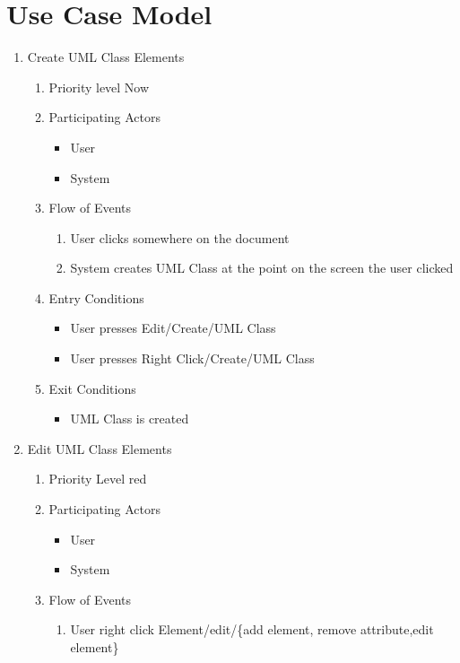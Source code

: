 \documentclass[a4paper, 12pt]{article}
\begin{document}
\section{Use Case Model}

\begin{enumerate}
	\item Create UML Class Elements
	\begin {enumerate}
		\item Priority level Now
		\item Participating Actors
		\begin{itemize}
			\item User
			\item System
		\end {itemize}
		\item Flow of Events
		\begin {enumerate}
			\item User clicks somewhere on the document
			\item System creates UML Class at the point on the screen the user clicked
		\end {enumerate}
		\item Entry Conditions
		\begin {itemize}
			\item User presses Edit/Create/UML Class
			\item User presses Right Click/Create/UML Class
		\end {itemize}
		\item Exit Conditions
		\begin {itemize}
			\item UML Class is created
		\end {itemize}
	\end {enumerate}

	\item Edit UML Class Elements
	\begin {enumerate}
		\item Priority Level red
		\item Participating Actors
		\begin {itemize}
			\item User 
			\item System
		\end {itemize}
		\item Flow of Events
		\begin {enumerate}
			\item User right click Element/edit/\{add element, remove attribute,edit element\}
			

\end{enumerate}
\end{enumerate}
\end{enumerate}
\end{document}
